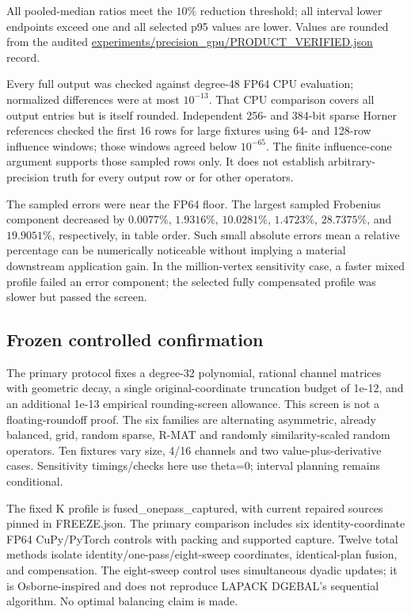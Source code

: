 \documentclass[10pt]{article}
\begin{document}
All pooled-median ratios meet the $10\%$ reduction threshold; all interval lower endpoints exceed one and all selected p95 values are lower. Values are rounded from the audited \url{experiments/precision_gpu/PRODUCT_VERIFIED.json} record.

Every full output was checked against degree-48 FP64 CPU evaluation; normalized differences were at most $10^{-13}$. That CPU comparison covers all output entries but is itself rounded. Independent 256- and 384-bit sparse Horner references checked the first 16 rows for large fixtures using 64- and 128-row influence windows; those windows agreed below $10^{-65}$. The finite influence-cone argument supports those sampled rows only. It does not establish arbitrary-precision truth for every output row or for other operators.

The sampled errors were near the FP64 floor. The largest sampled Frobenius component decreased by $0.0077\%$, $1.9316\%$, $10.0281\%$, $1.4723\%$, $28.7375\%$, and $19.9051\%$, respectively, in table order. Such small absolute errors mean a relative percentage can be numerically noticeable without implying a material downstream application gain. In the million-vertex sensitivity case, a faster mixed profile failed an error component; the selected fully compensated profile was slower but passed the screen.

\subsection{Frozen controlled confirmation}

The primary protocol fixes a degree-32 polynomial, rational channel matrices with geometric decay, a single original-coordinate truncation budget of 1e-12, and an additional 1e-13 empirical rounding-screen allowance. This screen is not a floating-roundoff proof. The six families are alternating asymmetric, already balanced, grid, random sparse, R-MAT and randomly similarity-scaled random operators. Ten fixtures vary size, 4/16 channels and two value-plus-derivative cases. Sensitivity timings/checks here use theta=0; interval planning remains conditional.

The fixed K profile is fused\_onepass\_captured, with current repaired sources pinned in FREEZE.json. The primary comparison includes six identity-coordinate FP64 CuPy/PyTorch controls with packing and supported capture. Twelve total methods isolate identity/one-pass/eight-sweep coordinates, identical-plan fusion, and compensation. The eight-sweep control uses simultaneous dyadic updates; it is Osborne-inspired and does not reproduce LAPACK DGEBAL's sequential algorithm. No optimal balancing claim is made.
\end{document}
